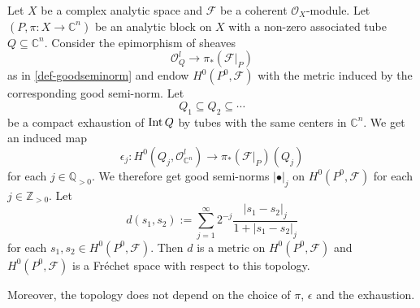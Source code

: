 \begin{lemma}\label{lma-comptopologies1}
    Let $X$ be a complex analytic space and $\mathcal{F}$ be a coherent $\mathcal{O}_X$-module.
Let $(P,\pi:X\rightarrow \mathbb{C}^n)$ be an analytic block on $X$ with a non-zero associated tube $Q\subseteq \mathbb{C}^n$. Consider the epimorphism of sheaves 
\[
    \mathcal{O}_Q^l\rightarrow \pi_*(\mathcal{F}|_P)
\]
as in \cref{def-goodseminorm} and endow $H^0(P^0,\mathcal{F})$ with the metric induced by the corresponding good semi-norm. Let 
\[
    Q_1\subseteq Q_2\subseteq \cdots
\]
be a compact exhaustion of $\operatorname{Int} Q$ by tubes with the same centers in $\mathbb{C}^n$. We get an induced map
\[
    \epsilon_j:H^0(Q_j,\mathcal{O}_{\mathbb{C}^n}^l) \rightarrow \pi_*(\mathcal{F}|_P)(Q_j) 
\]
for each $j\in \mathbb{Q}_{>0}$. We therefore get good semi-norms $|\bullet|_j$ on $H^0(P^0, \mathcal{F})$ for each $j\in \mathbb{Z}_{>0}$. Let
\[
    d(s_1,s_2):=\sum_{j=1}^{\infty}  2^{-j}\frac{|s_1-s_2|_j}{1+|s_1-s_2|_j}
\]
for each $s_1,s_2\in H^0(P^0, \mathcal{F})$. Then $d$ is a metric on  $H^0(P^0, \mathcal{F})$ and $H^0(P^0, \mathcal{F})$ is a Fréchet space with respect to this topology.

Moreover, the topology does not depend on the choice of $\pi$, $\epsilon$ and the exhaustion.
\end{lemma}
